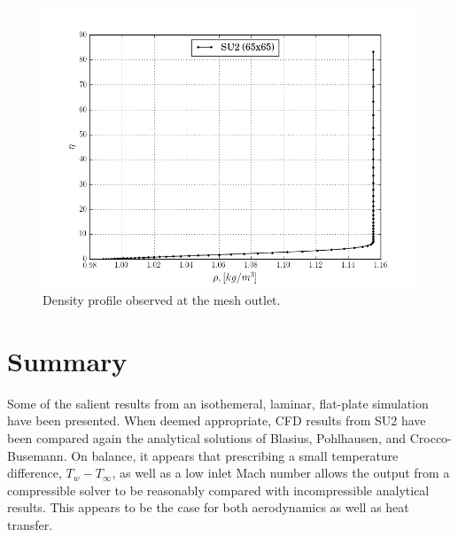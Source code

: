 \documentclass[12pt,letterpaper]{article}
\begin{document}
\begin{figure}[h] 
\centering
\includegraphics[width=\linewidth]{rho_profile.png}
\caption{Density profile observed at the mesh outlet.}
\label{fig:rho}
\end{figure}

\section*{Summary}
Some of the salient results from an isothemeral, laminar, flat-plate simulation have been presented. When deemed appropriate, CFD results from SU2 have been compared again the analytical solutions of Blasius, Pohlhausen, and Crocco-Busemann. On balance, it appears that prescribing a small temperature difference, $T_w-T_\infty$, as well as a low inlet Mach number allows the output from a compressible solver to be reasonably compared with incompressible analytical results. This appears to be the case for both aerodynamics as well as heat transfer.
\end{document}
